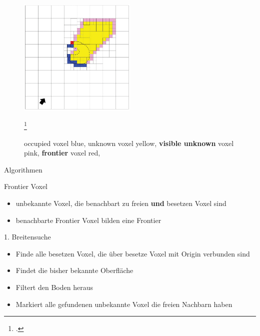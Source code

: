 \documentclass{beamer}
\begin{document}
\begin{frame}{}
	\centering
	\begin{figure}
		\includegraphics[width=0.5\textwidth]{Graphics/vasquez.png}
		\caption{occupied voxel blue, unknown voxel yellow, \textbf{visible unknown} voxel pink, \textbf{frontier} voxel red, }\footcite{vasquez-gomez_vpl_2020}
	\end{figure}
\end{frame}

\begin{frame}{Algorithmen}
	\begin{exampleblock}{Frontier Voxel}
		\begin{itemize}
			\item unbekannte Voxel, die benachbart zu freien \textbf{und} besetzen Voxel sind
			\item benachbarte Frontier Voxel bilden eine Frontier
		\end{itemize}
	\end{exampleblock}

	\begin{block}{1. Breitensuche}
		\begin{itemize}
			\item Finde alle besetzen Voxel, die über besetze Voxel mit Origin verbunden sind
			\item Findet die bisher bekannte Oberfläche
			\item Filtert den Boden heraus
			\item Markiert alle gefundenen unbekannte Voxel die freien Nachbarn haben
		\end{itemize}
	\end{block}
\end{frame}
\end{document}
